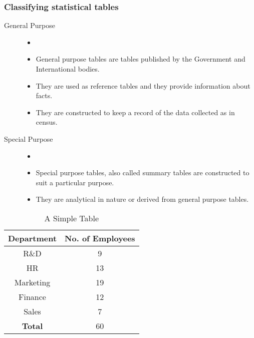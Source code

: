 \documentclass[
10pt, %
a4paper, %
]{report}
\begin{document}
\subsubsection*{Classifying statistical tables}
\begin{description}
\item[General Purpose]
\begin{itemize}
\item[]
\item General purpose tables are tables published by the Government and International bodies.
\item They are used as reference tables and they provide information about facts.
\item They are constructed to keep a record of the data collected as in census.
\end{itemize}
\item[Special Purpose]
\begin{itemize}
\item[]
\item Special purpose tables, also called summary tables are constructed to suit a particular purpose.
\item They are analytical in nature or derived from general purpose tables.
\end{itemize}
\end{description}

\begin{table} %
\begin{center}
\begin{tabular}{| c | c |}
\hline
Department & No. of Employees \\
\hline \hline
R\&D & 9 \\
\hline
HR & 13 \\
\hline
Marketing & 19 \\
\hline
Finance & 12 \\
\hline
Sales & 7 \\
\hline
\hline
\textbf{Total} & 60 \\
\hline
\end{tabular}
\end{center}
\caption{A Simple Table}
\label{tab:simple}
\end{table}
\end{document}
